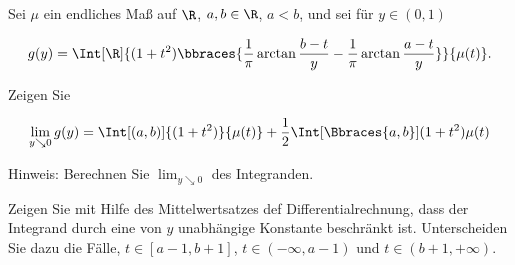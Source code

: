 
\begin{exercise}

Sei $\mu$ ein endliches Maß auf $\R$, $a, b \in \R$, $a < b$, und sei für $y \in (0, 1)$

\begin{align*}
    g(y)
    =
    \Int[\R]
    {
        (1 + t^2)
        \bbraces
        {
            \frac{1}{\pi}
            \arctan \frac{b - t}{y}
            -
            \frac{1}{\pi}
            \arctan \frac{a - t}{y}
        }
    }{
        \mu(t)
    }.
\end{align*}

Zeigen Sie

\begin{align*}
    \lim_{y \searrow 0} g(y)
    =
    \Int[(a, b)]{(1 + t^2)}{\mu(t)}
    +
    \frac{1}{2}
    \Int[\Bbraces{a, b}]{(1 + t^2)}{\mu(t)}
\end{align*}

Hinweis:
Berechnen Sie $\lim_{y \searrow 0}$ des Integranden.

Zeigen Sie mit Hilfe des Mittelwertsatzes def Differentialrechnung, dass der Integrand durch eine von $y$ unabhängige Konstante beschränkt ist.
Unterscheiden Sie dazu die Fälle, $t \in [a - 1, b + 1]$, $t \in (-\infty, a - 1)$ und $t \in (b + 1, +\infty)$.

\end{exercise}


